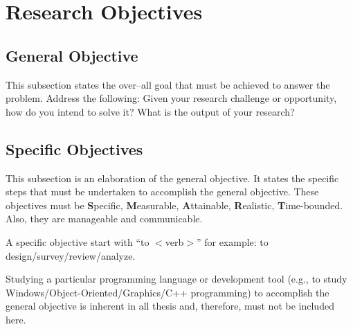 \section{Research Objectives}
\label{sec:researchobjectives}

\subsection{General Objective}
\label{sec:generalobjective}

This subsection states the over--all goal that must be achieved to answer the problem.
Address the following: Given your research challenge or opportunity, how do you intend  to solve it? What is the output of your research?


\subsection{Specific Objectives}
\label{sec:specificobjectives}

%
%

This subsection is an elaboration of the general objective.  
It states the specific steps that must be undertaken to accomplish the general objective.  
These objectives must be \textbf{S}pecific, \textbf{M}easurable, \textbf{A}ttainable, \textbf{R}ealistic, \textbf{T}ime-bounded. Also, they are manageable and communicable.  

A specific objective start with ``to $<$verb$>$'' for example: to design/survey/review/analyze.

Studying a particular programming language or development tool (e.g., to study Windows/Object-Oriented/Graphics/C++ programming) to  accomplish the general objective is inherent in all thesis and, therefore, must not be included here.


